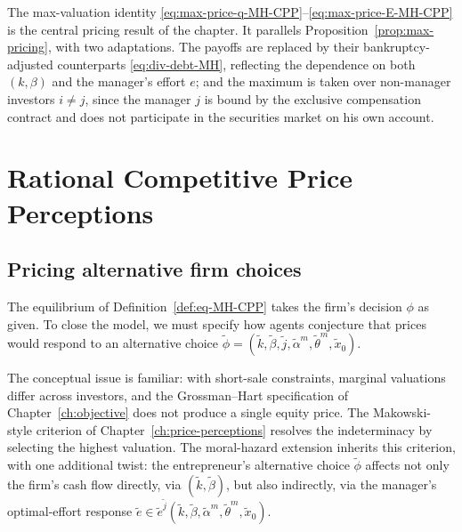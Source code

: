 \documentclass[11pt,a4paper,oneside]{book}
\theoremstyle{plain}
\theoremstyle{definition}
\theoremstyle{remark}
\numberwithin{equation}{chapter}
\begin{document}
The max-valuation identity \eqref{eq:max-price-q-MH-CPP}--\eqref{eq:max-price-E-MH-CPP} is the central pricing result of the chapter.
It parallels Proposition~\ref{prop:max-pricing}, with two adaptations.
The payoffs are replaced by their bankruptcy-adjusted counterparts \eqref{eq:div-debt-MH}, reflecting the dependence on both $(k, \beta)$ and the manager's effort $e$; and the maximum is taken over non-manager investors $i \neq j$, since the manager $j$ is bound by the exclusive compensation contract and does not participate in the securities market on his own account.

\section{Rational Competitive Price Perceptions}
\label{sec:RCPP-MH-CPP}

\subsection{Pricing alternative firm choices}

The equilibrium of Definition~\ref{def:eq-MH-CPP} takes the firm's decision $\phi$ as given.
To close the model, we must specify how agents conjecture that prices would respond to an alternative choice $\widetilde{\phi} = (\widetilde{k}, \widetilde{\beta}, \widetilde{j}, \widetilde{\alpha}^m, \widetilde{\theta}^m, \widetilde{x}_0)$.

The conceptual issue is familiar: with short-sale constraints, marginal valuations differ across investors, and the Grossman--Hart specification of Chapter~\ref{ch:objective} does not produce a single equity price.
The Makowski-style criterion of Chapter~\ref{ch:price-perceptions} resolves the indeterminacy by selecting the highest valuation.
The moral-hazard extension inherits this criterion, with one additional twist: the entrepreneur's alternative choice $\widetilde{\phi}$ affects not only the firm's cash flow directly, via $(\widetilde{k}, \widetilde{\beta})$, but also indirectly, via the manager's optimal-effort response $\widetilde{e} \in \widetilde{e}^{\widetilde{j}}(\widetilde{k}, \widetilde{\beta}, \widetilde{\alpha}^m, \widetilde{\theta}^m, \widetilde{x}_0)$.
\end{document}
